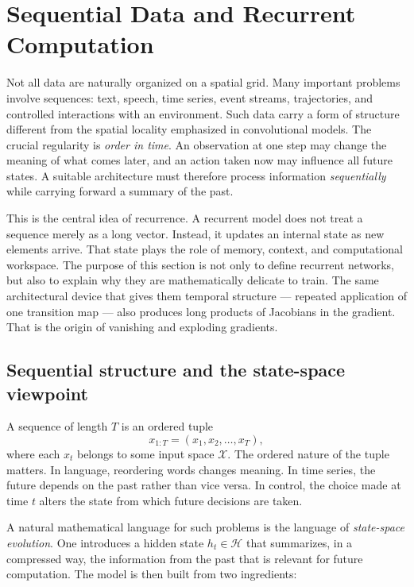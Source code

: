 \section{Sequential Data and Recurrent Computation}

Not all data are naturally organized on a spatial grid.
Many important problems involve sequences:
text, speech, time series, event streams, trajectories, and controlled interactions with an environment.
Such data carry a form of structure different from the spatial locality emphasized in convolutional models.
The crucial regularity is \emph{order in time}.
An observation at one step may change the meaning of what comes later, and an action taken now may influence all future states.
A suitable architecture must therefore process information \emph{sequentially} while carrying forward a summary of the past.

\medskip

This is the central idea of recurrence.
A recurrent model does not treat a sequence merely as a long vector.
Instead, it updates an internal state as new elements arrive.
That state plays the role of memory, context, and computational workspace.
The purpose of this section is not only to define recurrent networks, but also to explain why they are mathematically delicate to train.
The same architectural device that gives them temporal structure --- repeated application of one transition map --- also produces long products of Jacobians in the gradient.
That is the origin of vanishing and exploding gradients.

\subsection*{Sequential structure and the state-space viewpoint}

A sequence of length $T$ is an ordered tuple
\[
 x_{1:T} = (x_1, x_2, \dots, x_T),
\]
where each $x_t$ belongs to some input space $\mathcal{X}$.
The ordered nature of the tuple matters.
In language, reordering words changes meaning.
In time series, the future depends on the past rather than vice versa.
In control, the choice made at time $t$ alters the state from which future decisions are taken.

\medskip

A natural mathematical language for such problems is the language of \emph{state-space evolution}.
One introduces a hidden state $h_t \in \mathcal{H}$ that summarizes, in a compressed way, the information from the past that is relevant for future computation.
The model is then built from two ingredients:

